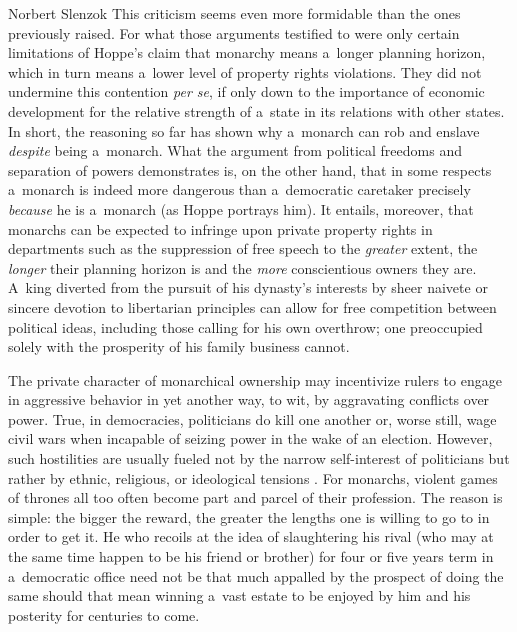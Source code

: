 \begin{artengenv}{Norbert Slenzok}
This criticism seems even more formidable than the ones previously raised. For what those arguments testified to were only certain limitations of Hoppe's claim that monarchy means a~longer planning horizon, which in turn means a~lower level of property rights violations. They did not undermine this contention \textit{per se}, if only down to the importance of economic development for the relative strength of a~state in its relations with other states. In short, the reasoning so far has shown why a~monarch can rob and enslave \textit{despite} being a~monarch. What the argument from political freedoms and separation of powers demonstrates is, on the other hand, that in some respects a~monarch is indeed more dangerous than a~democratic caretaker precisely \textit{because} he is a~monarch (as Hoppe portrays him). It entails, moreover, that monarchs can be expected to infringe upon private property rights in departments such as the suppression of free speech to the \textit{greater} extent, the \textit{longer} their planning horizon is and the \textit{more} conscientious owners they are. A~king diverted from the pursuit of his dynasty's interests by sheer naivete or sincere devotion to libertarian principles can allow for free competition between political ideas, including those calling for his own overthrow; one preoccupied solely with the prosperity of his family business cannot.



The private character of monarchical ownership may incentivize rulers to engage in aggressive behavior in yet another way, to wit, by aggravating conflicts over power. True, in democracies, politicians do kill one another or, worse still, wage civil wars when incapable of seizing power in the wake of an election. However, such hostilities are usually fueled not by the narrow self-interest of politicians but rather by ethnic, religious, or ideological tensions 
\parencite[][]{megger_krytyczna_2018}. %
 For monarchs, violent games of thrones all too often become part and parcel of their profession. The reason is simple: the bigger the reward, the greater the lengths one is willing to go to in order to get it. He who recoils at the idea of slaughtering his rival (who may at the same time happen to be his friend or brother) for four or five years term in a~democratic office need not be that much appalled by the prospect of doing the same should that mean winning a~vast estate to be enjoyed by him and his posterity for centuries to come.




\end{artengenv}

